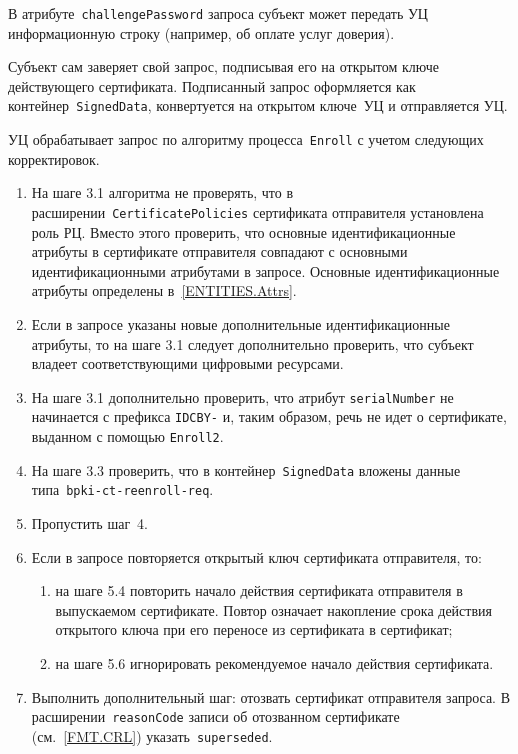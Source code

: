 В атрибуте~\texttt{challengePassword} запроса субъект может передать УЦ 
информационную строку (например, об оплате услуг доверия).

Субъект сам заверяет свой запрос, подписывая его на открытом ключе 
действующего сертификата. Подписанный запрос оформляется как 
контейнер~\texttt{SignedData}, конвертуется на открытом ключе~УЦ
и отправляется УЦ.

УЦ обрабатывает запрос по алгоритму процесса~\texttt{Enroll}
с учетом следующих корректировок.
\begin{enumerate}
\item
На шаге 3.1 алгоритма не проверять, что в
расширении~\texttt{CertificatePolicies} сертификата отправителя установлена
роль РЦ. Вместо этого проверить, что основные идентификационные атрибуты
в сертификате отправителя совпадают с основными идентификационными
атрибутами в запросе. Основные идентификационные атрибуты определены
в~\ref{ENTITIES.Attrs}.

\item
Если в запросе указаны новые дополнительные идентификационные атрибуты,
то на шаге 3.1 следует дополнительно проверить, что субъект 
владеет соответствующими цифровыми ресурсами. 

\item
На шаге 3.1 дополнительно проверить, что атрибут \texttt{serialNumber}
не начинается с префикса \texttt{IDCBY-} и, таким образом,
речь не идет о сертификате, выданном с помощью \texttt{Enroll2}.
 
\item
На шаге 3.3 проверить, что в контейнер~\texttt{SignedData} вложены данные 
типа~\texttt{bpki-ct-reenroll-req}. 

\item
Пропустить шаг~4.

\item
Если в запросе повторяется открытый ключ сертификата отправителя, то:
\begin{enumerate}
\item
на шаге 5.4 повторить начало действия сертификата отправителя в выпускаемом 
сертификате. Повтор означает накопление срока действия открытого ключа 
при его переносе из сертификата в сертификат; 

%

\item
на шаге 5.6 игнорировать рекомендуемое начало действия сертификата.
\end{enumerate}

\item
Выполнить дополнительный шаг: отозвать сертификат отправителя запроса.
%
В расширении~\texttt{reasonCode} записи об отозванном сертификате 
(см.~\ref{FMT.CRL}) указать~\texttt{superseded}.
\end{enumerate}

